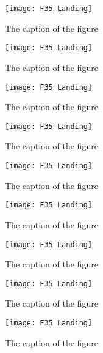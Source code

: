 \documentclass[12pt, oneside]{report}
\begin{document}
\begin{figure}[h]
  \centering
  \texttt{[image: F35 Landing]}
  \caption{The caption of the figure}
  \label{fig:BlockDiagram3}
\end{figure}

\begin{figure}[h]
  \centering
  \texttt{[image: F35 Landing]}
  \caption{The caption of the figure}
  \label{fig:BlockDiagram4}
\end{figure}

\begin{figure}[h]
  \centering
  \texttt{[image: F35 Landing]}
  \caption{The caption of the figure}
  \label{fig:BlockDiagram4}
\end{figure}

\begin{figure}[h]
  \centering
  \texttt{[image: F35 Landing]}
  \caption{The caption of the figure}
  \label{fig:BlockDiagram4}
\end{figure}

\begin{figure}[h]
  \centering
  \texttt{[image: F35 Landing]}
  \caption{The caption of the figure}
  \label{fig:BlockDiagram4}
\end{figure}

\begin{figure}[h]
  \centering
  \texttt{[image: F35 Landing]}
  \caption{The caption of the figure}
  \label{fig:BlockDiagram4}
\end{figure}

\begin{figure}[h]
  \centering
  \texttt{[image: F35 Landing]}
  \caption{The caption of the figure}
  \label{fig:BlockDiagram4}
\end{figure}

\begin{figure}[h]
  \centering
  \texttt{[image: F35 Landing]}
  \caption{The caption of the figure}
  \label{fig:BlockDiagram4}
\end{figure}

\begin{figure}[h]
  \centering
  \texttt{[image: F35 Landing]}
  \caption{The caption of the figure}
  \label{fig:BlockDiagram4}
\end{figure}


\end{document}
